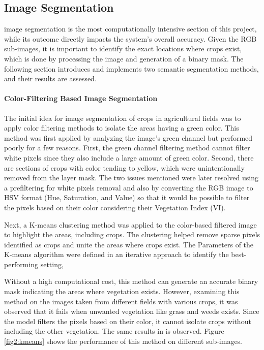 \documentclass[conference]{IEEEtran}
\begin{document}
\subsection{Image Segmentation}\label{Image Segmentation}
image segmentation is the most computationally intensive section of this project, while its outcome directly impacts the system's overall accuracy. Given the RGB sub-images, it is important to identify the exact locations where crops exist, which is done by processing the image and generation of a binary mask. The following section introduces and implements two semantic segmentation methods, and their results are assessed.

\paragraph{Color-Filtering Based Image Segmentation}
The initial idea for image segmentation of crops in agricultural fields was to apply color filtering methods to isolate the areas having a green color. This method was first applied by analyzing the image's green channel but performed poorly for a few reasons. First, the green channel filtering method cannot filter white pixels since they also include a large amount of green color. Second, there are sections of crops with color tending to yellow, which were unintentionally removed from the layer mask. The two issues mentioned were later resolved using a prefiltering for white pixels removal and also by converting the RGB image to HSV format (Hue, Saturation, and Value) so that it would be possible to filter the pixels based on their color considering their Vegetation Index (VI).

Next, a K-means clustering method was applied to the color-based filtered image to highlight the areas, including crops. The clustering helped remove sparse pixels identified as crops and unite the areas where crops exist. The Parameters of the K-means algorithm were defined in an iterative approach to identify the best-performing setting,

Without a high computational cost, this method can generate an accurate binary mask indicating the areas where vegetation exists. However, examining this method on the images taken from different fields with various crops, it was observed that it fails when unwanted vegetation like grass and weeds exists. Since the model filters the pixels based on their color, it cannot isolate crops without including the other vegetation. The same results in
\cite{b5} is observed.
Figure 
\ref{fig2:kmeans} shows the performance of this method on different sub-images.
\end{document}
